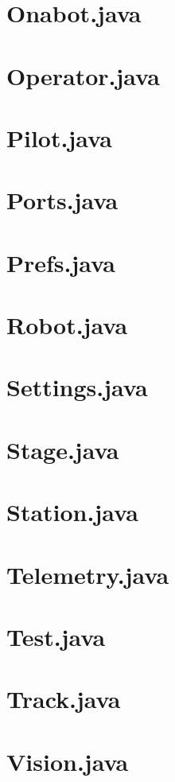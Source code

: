 \newpage\section*{Onabot.java}
\newpage\section*{Operator.java}
\newpage\section*{Pilot.java}
\newpage\section*{Ports.java}
\newpage\section*{Prefs.java}
\newpage\section*{Robot.java}
\newpage\section*{Settings.java}
\newpage\section*{Stage.java}
\newpage\section*{Station.java}
\newpage\section*{Telemetry.java}
\newpage\section*{Test.java}
\newpage\section*{Track.java}
\newpage\section*{Vision.java}
